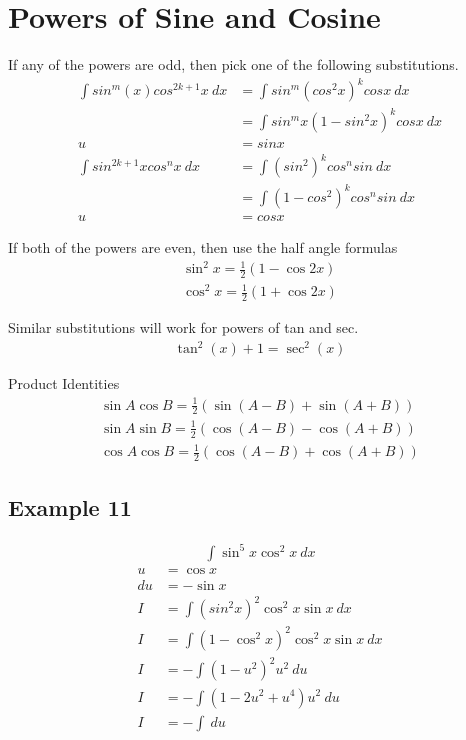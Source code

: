 \documentclass{article}
\theoremstyle{mytheoremstyle}
\theoremstyle{mytheoremstyle}
\theoremstyle{myproblemstyle}
\begin{document}
    \section*{Powers of Sine and Cosine}
    If any of the powers are odd, then pick one of the following substitutions.
    \begin{align*}
        \int sin^m(x)cos^{2k+1}x \ dx &= \int sin^m (cos^2 x)^k cosx \ dx \\
                                      &= \int sin^m x (1-sin^2 x)^k cos x \ dx \\
        u &= sin x \\
        \int sin^{2k+1} x cos^n x \ dx &= \int (sin^2)^k cos^n sin \ dx \\
                                       &= \int (1-cos^2)^k cos^n sin \ dx \\
        u &= cos x
    \end{align*}

    If both of the powers are even, then use the half angle formulas
    \begin{align*}
        \sin^2 x = \frac{1}{2} (1-\cos 2x) \\
        \cos^2 x = \frac{1}{2} (1+\cos 2x)
    \end{align*}

    Similar substitutions will work for powers of tan and sec.
    \begin{align*}
        \tan^2(x)+1 = \sec^2(x)
    \end{align*}

    Product Identities
    \begin{align*}
        \sin A \cos B = \frac{1}{2} (\sin(A-B)+\sin(A+B)) \\
        \sin A \sin B = \frac{1}{2} (\cos(A-B)-\cos(A+B)) \\
        \cos A \cos B = \frac{1}{2} (\cos(A-B)+\cos(A+B))
    \end{align*}


    \subsection*{Example 11}
    \begin{align*}
        \int \sin^5 x \cos^2 x \ dx
    \end{align*}
    \begin{align*}
        u &= \cos x \\
        du &= -\sin x \\
        I &= \int (sin^2 x)^2 \cos^2 x \sin x \ dx \\
        I &= \int (1-\cos^2 x)^2 \cos^2 x \sin x \ dx \\
        I &= -\int (1-u^2)^2 u^2 \ du \\
        I &= -\int (1-2u^2+u^4) u^2 \ du \\
        I &= -\int  \ du
    \end{align*}
\end{document}
